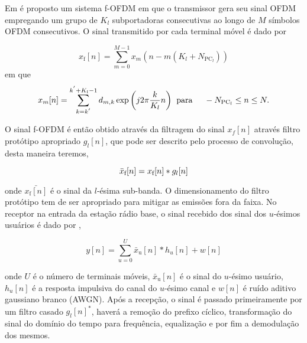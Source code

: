 Em \cite{fOFDM_hwawei} é proposto um sistema f-OFDM em que o transmissor gera seu sinal OFDM empregando um grupo de $K_{l}$ subportadoras consecutivas ao longo de $M$ símbolos OFDM consecutivos. O sinal transmitido por cada terminal móvel é dado por \par

\begin{equation}
x_{\text{f}}[n] = \sum_{m = 0}^{M-1}x_{m}(n - m(K_{l} + N_{\text{PC}_{l}}))
\end{equation}
em que
\begin{equation}
x_{m}[n] = \sum_{k = k^{'}}^{k^{'} + K_{l} - 1}d_{m,k}\exp\bigg(j2\pi \frac{k}{K_{l}}n\bigg)
\hspace{0.2cm}\textrm{para}\hspace{0.5cm} -N_{\text{PC}_{l}} \leq n \leq N.
\end{equation}

O sinal f-OFDM é então obtido através da filtragem do sinal $x_{f}[n]$ através filtro protótipo apropriado $g_{l}[n]$, que pode ser descrito pelo processo de convolução, desta maneira teremos, \par

\begin{equation}
\centering
\bar{x}_{\text{f}}[n] = x_{\text{f}}[n] * g_{l}[n]
\end{equation}

\nonident onde $\bar{x_{\text{f}}[n]}$ é o sinal da $l$-ésima sub-banda. O dimensionamento do filtro protótipo tem de ser apropriado para mitigar as emissões fora da faixa. No receptor na entrada da estação rádio base, o sinal recebido dos sinal dos $u$-ésimos usuários é dado por \cite{fOFDM_hwawei}, \par

\begin{equation} \label{eq:received}
y[n] = \sum_{u = 0}^{U} \bar{x}_{\text{u}}[n] * h_{u}[n] + w[n]
\end{equation}

onde $U$ é o número de terminais móveis, $\bar{x}_{\text{u}}[n]$ é o sinal do $u$-ésimo usuário, $h_{u}[n]$ é a resposta impulsiva do canal do $u$-ésimo canal e $w[n]$ é ruído aditivo gaussiano branco (AWGN). Após a recepção, o sinal é passado primeiramente por um filtro casado $g_{l}[n]^*$, haverá a remoção do prefixo cíclico, transformação do sinal do domínio do tempo para frequência, equalização e por fim a demodulação dos mesmos. \par
